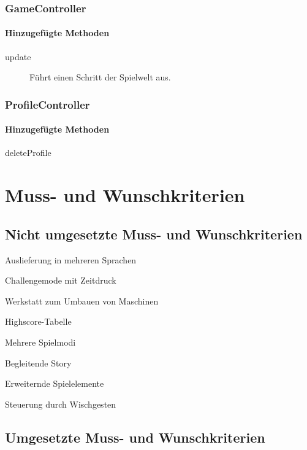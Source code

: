 \documentclass[parskip=full]{scrreprt}
\begin{document}
\subsection{GameController}

\subsubsection{Hinzugefügte Methoden}
\begin{description}
	\item[update] Führt einen Schritt der Spielwelt aus.
\end{description}


\subsection{ProfileController}

\subsubsection{Hinzugefügte Methoden}
\begin{description}
	\item[deleteProfile]
\end{description}

\chapter{Muss- und Wunschkriterien}

\section{Nicht umgesetzte Muss- und Wunschkriterien}

\begin{description}
	\item Auslieferung in mehreren Sprachen
	\item Challengemode mit Zeitdruck
	\item Werkstatt zum Umbauen von Maschinen
	\item Highscore-Tabelle
	\item Mehrere Spielmodi
	\item Begleitende Story
	\item Erweiternde Spielelemente
	\item Steuerung durch Wischgesten
\end{description}

\section{Umgesetzte Muss- und Wunschkriterien}
\end{document}
